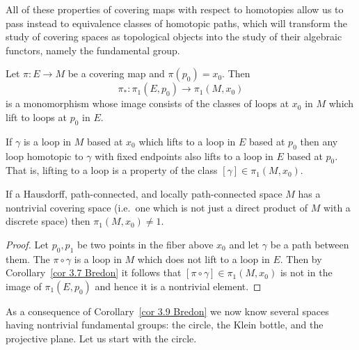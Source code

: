 All of these properties of covering maps with respect to homotopies allow us to pass instead to equivalence classes of homotopic paths, which will transform the study of covering spaces as topological objects into the study of their algebraic functors, namely the fundamental group. 
\begin{cor}\label{cor 3.7 Bredon}
    Let $\pi:E\to M$ be a covering map and $\pi(p_0)=x_0$. Then \[\pi_\ast : \pi_1(E,p_0)\to \pi_1(M,x_0)\] is a monomorphism whose image consists of the classes of loops at $x_0$ in $M$ which lift to loops at $p_0$ in $E$.
\end{cor}
\begin{cor}
    If $\gamma$ is a loop in $M$ based at $x_0$ which lifts to a loop in $E$ based at $p_0$ then any loop homotopic to $\gamma$ with fixed endpoints also lifts to a loop in $E$ based at $p_0$.  That is, lifting to a loop is a property of the class $[\gamma]\in\pi_1(M,x_0)$.
\end{cor}
\begin{cor}\label{cor 3.9 Bredon}
    If a Hausdorff, path-connected, and locally path-connected space $M$ has a nontrivial covering space (i.e.\ one which is not just a direct product of $M$ with a discrete space) then $\pi_1(M,x_0)\neq 1$.
\end{cor}
\begin{proof}
    Let $p_0,p_1$ be two points in the fiber above $x_0$ and let $\gamma $ be a path between them. The  $\pi\circ \gamma$ is a loop in $M$ which does not lift to a loop in $E$. Then  by Corollary~\ref{cor 3.7 Bredon} it follows that $[\pi\circ \gamma]\in\pi_1(M,x_0)$ is not in the image of $\pi_1(E,p_0)$ and hence it is a nontrivial element.
\end{proof}

As a consequence of Corollary~\ref{cor 3.9 Bredon} we now know several spaces having nontrivial fundamental groups: the circle, the Klein bottle, and the projective plane. Let us start with the circle.

